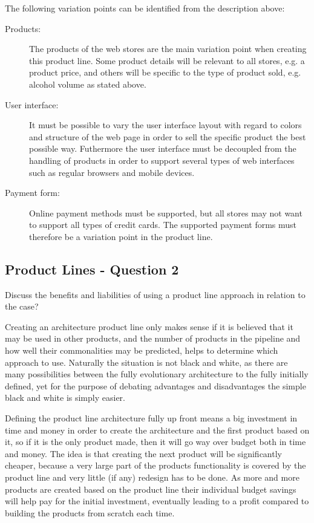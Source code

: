 The following variation points can be identified from the description above:

\begin{description}
	\item[Products:] The products of the web stores are the main variation point when creating this product line. Some product details will be relevant to all stores, e.g. a product price, and others will be specific to the type of product sold, e.g. alcohol volume as stated above.
	\item[User interface:] It must be possible to vary the user interface layout with regard to colors and structure of the web page in order to sell the specific product the best possible way. Futhermore the user interface must be decoupled from the handling of products in order to support several types of web interfaces such as regular browsers and mobile devices.
	\item[Payment form:] Online payment methods must be supported, but all stores may not want to support all types of credit cards. The supported payment forms must therefore be a variation point in the product line.
\end{description}





\subsection{Product Lines - Question 2}
\label{sec:pl_q2}
\begin{question}
Discuss the benefits and liabilities of using a product line
approach in relation to the case?
\end{question}

Creating an architecture product line only makes sense if it is believed that it may be used in other products, and the number of products in the pipeline and how well their commonalities may be predicted, helps to determine which approach to use. Naturally the situation is not black and white, as there are many possibilities between the fully evolutionary architecture to the fully initially defined, yet for the purpose of debating advantages and disadvantages the simple black and white is simply easier.

Defining the product line architecture fully up front means a big investment in time and money in order to create the architecture and the first product based on it, so if it is the only product made, then it will go way over budget both in time and money. The idea is that creating the next product will be significantly cheaper, because a very large part of the products functionality is covered by the product line and very little (if any) redesign has to be done. As more and more products are created based on the product line their individual budget savings will help pay for the initial investment, eventually leading to a profit compared to building the products from scratch each time.

